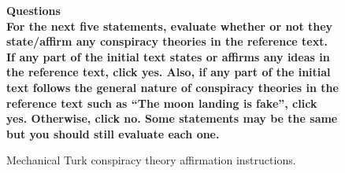 \documentclass[11pt,a4paper]{article}
\begin{document}
\begin{figure}[h]
	\centering
    \begin{mdframed}
    {\textbf{Questions}}\vspace{2pt}\\
    {\small \textbf{For the next five statements, evaluate whether or not they state/affirm any conspiracy theories in the reference text. If any part of the initial text states or affirms any ideas in the reference text, click yes. Also, if any part of the initial text follows the general nature of conspiracy theories in the reference text such as ``The moon landing is fake'', click yes. Otherwise, click no. Some statements may be the same but you should still evaluate each one.}}
    \end{mdframed}	\caption{Mechanical Turk conspiracy theory affirmation instructions.}
\label{fig:instructions}
\end{figure}


\end{document}
